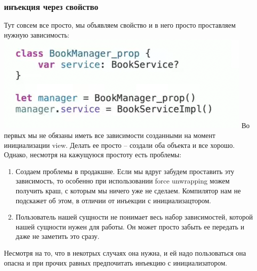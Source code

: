 \documentclass{article}
\begin{document}
    \subsubsection{инъекция через свойство}
    Тут совсем все просто, мы объявляем свойство и в него просто проставляем нужную зависимость: 
    \newline
    \includegraphics[scale = 0.5]{pic/Снимок экрана 2023-07-31 в 01.11.34.png}
    \newline
    Во первых мы не обязаны иметь все зависимости созданными на момент инициализации view. Делать ее просто -- создали оба объекта и все хорошо. Однако, несмотря на кажущуюся простоту есть проблемы: 
    \begin{enumerate}
        \item Создаем проблемы в продакшне. Если мы вдруг забудем проставить эту зависимость, то особенно при использовании force unwrapping можем получить краш, с которым мы ничего уже не сделаем. Компилятор нам не подскажет об этом, в отличии от инъекции с инициализацтором. 
        \item Пользователь нашей сущности не понимает весь набор зависимостей, которой нашей сущности нужен для работы. Он может просто забыть ее передать и даже не заметить это сразу. 
    \end{enumerate}
    Несмотря на то, что в некотрых случаях она нужна, и ей надо пользоваться она опасна и при прочих равных предпочитать инъекцию с инициализатором. 
\end{document}
